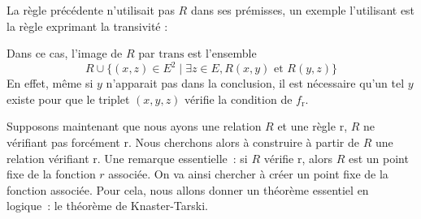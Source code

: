 \begin{example}
  La règle précédente n'utilisait pas $R$ dans ses prémisses, un exemple
  l'utilisant est la règle exprimant la transivité :
  \begin{prooftree}
  \end{prooftree}
  Dans ce cas, l'image de $R$ par $\mathrm{trans}$ est l'ensemble
  \[R \cup \{ (x,z) \in E^2\mid \exists z \in E, R(x,y)\text{ et } R(y,z)\}\]
  En effet, même si $y$ n'apparait pas dans la conclusion, il est nécessaire
  qu'un tel $y$ existe pour que le triplet $(x,y,z)$ vérifie la condition
  de $f_\mathrm r$.
\end{example}

Supposons maintenant que nous ayons une relation $R$ et une règle $\mathrm r$,
$R$ ne vérifiant pas forcément $\mathrm r$. Nous cherchons alors à construire à
partir de $R$ une relation vérifiant $\mathrm r$. Une remarque essentielle~: si
$R$ vérifie $\mathrm r$, alors $R$ est un point fixe de la fonction $r$
associée. On va ainsi chercher à créer un point fixe de la fonction associée.
Pour cela, nous allons donner un théorème essentiel en logique~: le théorème de
Knaster-Tarski.

